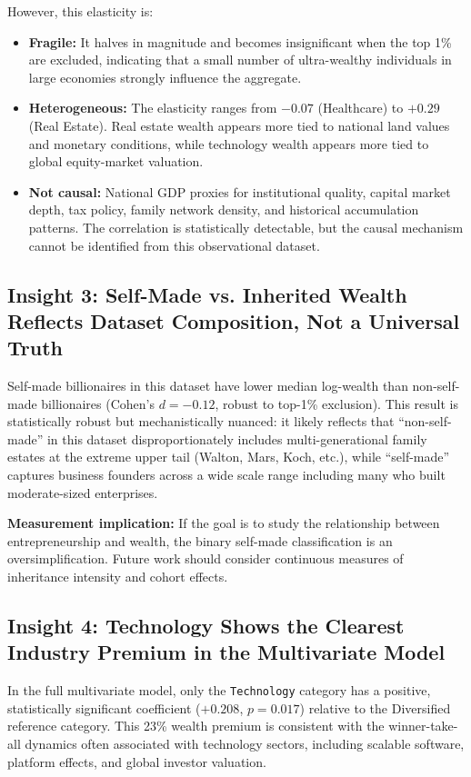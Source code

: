 \documentclass[a4paper,10pt]{article}
\begin{document}
However, this elasticity is:
\begin{itemize}
  \item \textbf{Fragile:} It halves in magnitude and becomes insignificant when the top 1\% are excluded, indicating that a small number of ultra-wealthy individuals in large economies strongly influence the aggregate.
  \item \textbf{Heterogeneous:} The elasticity ranges from $-0.07$ (Healthcare) to $+0.29$ (Real Estate). Real estate wealth appears more tied to national land values and monetary conditions, while technology wealth appears more tied to global equity-market valuation.
  \item \textbf{Not causal:} National GDP proxies for institutional quality, capital market depth, tax policy, family network density, and historical accumulation patterns. The correlation is statistically detectable, but the causal mechanism cannot be identified from this observational dataset.
\end{itemize}

\bigskip

\subsection{Insight 3: Self-Made vs. Inherited Wealth Reflects Dataset Composition, Not a Universal Truth}
Self-made billionaires in this dataset have lower median log-wealth than non-self-made billionaires (Cohen's $d = -0.12$, robust to top-1\% exclusion). This result is statistically robust but mechanistically nuanced: it likely reflects that ``non-self-made'' in this dataset disproportionately includes multi-generational family estates at the extreme upper tail (Walton, Mars, Koch, etc.), while ``self-made'' captures business founders across a wide scale range including many who built moderate-sized enterprises.

\textbf{Measurement implication:} If the goal is to study the relationship between entrepreneurship and wealth, the binary self-made classification is an oversimplification. Future work should consider continuous measures of inheritance intensity and cohort effects.

\bigskip

\subsection{Insight 4: Technology Shows the Clearest Industry Premium in the Multivariate Model}
In the full multivariate model, only the \texttt{Technology} category has a positive, statistically significant coefficient ($+0.208$, $p = 0.017$) relative to the Diversified reference category. This 23\% wealth premium is consistent with the winner-take-all dynamics often associated with technology sectors, including scalable software, platform effects, and global investor valuation.
\end{document}
